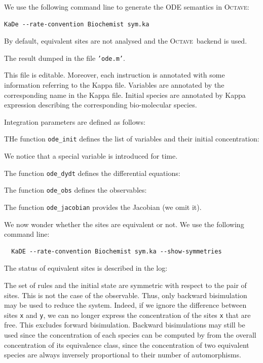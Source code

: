 \documentclass[11pt]{book}
\begin{document}
We use the following command line to generate the ODE semantics in \textsc{Octave}:
\begin{verbatim}
KaDe --rate-convention Biochemist sym.ka
\end{verbatim}

By default, equivalent sites are not analysed and the \textsc{Octave} backend is used.

The result dumped in the file \texttt{'ode.m'}.

This file is editable. Moreover, each instruction is annotated with some information referring to the Kappa file. Variables are annotated by the corresponding name in the Kappa file. Initial species are annotated by Kappa expression describing the corresponding bio-molecular species.


\lstset{numbers=none}

Integration parameters are defined as follows:


THe function \texttt{ode\_init} defines the list of variables and their initial concentration:

We notice that a special variable is introduced for time.

The function \texttt{ode\_dydt} defines the differential equations:


The function \texttt{ode\_obs} defines the observables:


The function \texttt{ode\_jacobian} provides the Jacobian (we omit it).

We now wonder whether the sites are equivalent or not. We use the following command line:
\begin{verbatim}
  KaDE --rate-convention Biochemist sym.ka --show-symmetries
\end{verbatim}
The status of equivalent sites is described in the log:


The set of rules and the initial state are symmetric with respect to the pair of sites. This is not the case of the observable. Thus, only backward bisimulation may be used to reduce the system. Indeed, if we ignore the difference between sites \texttt{x} and \texttt{y}, we can no longer express the concentration of the sites  \texttt{x} that are free. This  excludes forward bisimulation. Backward bisimulations may still be used since the concentration of each species can be computed by from the overall concentration of its equivalence class,  since the concentration of two equivalent species are always inversely proportional to their number of automorphisms.
\end{document}
